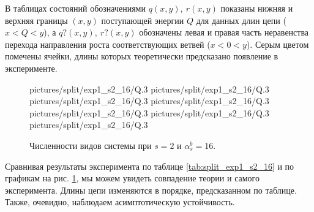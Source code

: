 В таблицах состояний обозначениями \(q(x,y), ~ r(x,y)\) показаны нижняя и верхняя границы \((x, y)\) поступающей энергии \(Q\) для данных длин цепи (\(x < Q < y\)), а \(q?(x,y), ~ r?(x,y)\) обозначены левая и правая часть неравенства перехода направления роста соответствующих ветвей (\(x < 0 < y\)). Серым цветом помечены ячейки, длины которых теоретически предсказано появление в эксперименте.

\begin{figure}[H]
    \centering
       {pictures/split/exp1_s2_16/Q}{.3}
      {pictures/split/exp1_s2_16/Q}{.3}
      {pictures/split/exp1_s2_16/Q}{.3}
      {pictures/split/exp1_s2_16/Q}{.3}
      {pictures/split/exp1_s2_16/Q}{.3}
      {pictures/split/exp1_s2_16/Q}{.3}
      {pictures/split/exp1_s2_16/Q}{.3}
\caption{Численности видов системы при \(s=2\) и \(\alpha^b_s = 16\).} \label{fig:split_exp1_s2_16}
\end{figure}
Сравнивая результаты эксперимента по таблице \ref{tab:split_exp1_s2_16} и по графикам на рис. \ref{fig:split_exp1_s2_16}, мы можем увидеть совпадение теории и самого эксперимента. Длины цепи изменяются в порядке, предсказанном по таблице. Также, очевидно, наблюдаем асимптотическую устойчивость.

